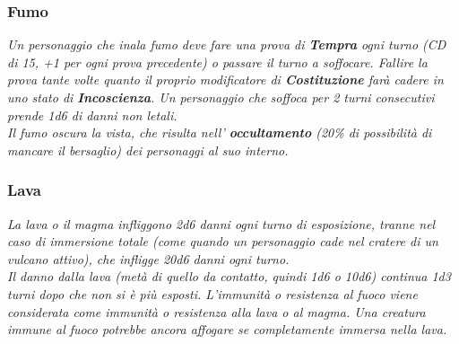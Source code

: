 				\subsubsection{Fumo}
					\emph{Un personaggio che inala fumo deve fare una prova di \textbf{Tempra} ogni turno (CD di 15, +1 per ogni prova precedente) o passare il turno a soffocare. Fallire la prova tante volte quanto il proprio modificatore di \textbf{Costituzione} farà cadere in uno stato di \textbf{Incoscienza}. Un personaggio che soffoca per 2 turni consecutivi prende \textit{1d6} di danni non letali.\\
					Il fumo oscura la vista, che risulta nell' \textbf{occultamento} (20\% di possibilità di mancare il bersaglio) dei personaggi al suo interno.}
				\subsubsection{Lava}
					\emph{
						La lava o il magma infliggono \textit{2d6} danni ogni turno di esposizione, tranne nel caso di immersione totale (come quando un personaggio cade nel cratere di un vulcano attivo), che infligge \textit{20d6} danni ogni turno.\\
						Il danno dalla lava (metà di quello da contatto, quindi \textit{1d6} o \textit{10d6}) continua \textit{1d3} turni dopo che non si è più esposti. L'immunità o resistenza al fuoco viene considerata come immunità o resistenza alla lava o al magma. Una creatura immune al fuoco potrebbe ancora affogare se completamente immersa nella lava.}
	
